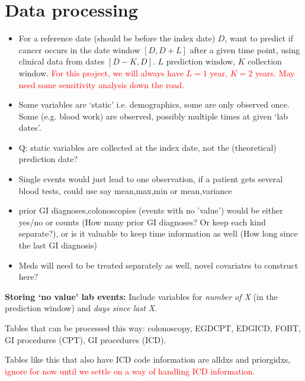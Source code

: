 \documentclass[12pt]{article}
\newcommand{\note}[1]{\textcolor{red}{#1}}
\begin{document}
%

\section*{Data processing}

\begin{itemize}
  \item For a reference date (should be before the index date) $D$, want to predict if cancer occurs in the date window $[D,D+L]$ after a given time point, using clinical data from dates $[D-K,D]$. $L$ prediction window, $K$ collection window. \note{For this project, we will always have $L=1$ year, $K=2$ years. May need some sensitivity analysis down the road.}
  \item Some variables are `static' i.e. demographics, some are only observed once. Some (e.g. blood work) are observed, possibly multiple times at given `lab dates'.
  \item Q: static variables are collected at the index date, not the (theoretical) prediction date?
  \item Single events would just lead to one observation, if a patient gets several blood tests, could use say mean,max,min or mean,variance
  \item prior GI diagnoses,colonoscopies (events with no 'value') would be either yes/no or counts (How many prior GI diagnoses? Or keep each kind separate?), or is it valuable to keep time information as well (How long since the last GI diagnosis)
  \item Meds will need to be treated separately as well, novel covariates to construct here?
\end{itemize}

{\bf Storing `no value' lab events:} Include variables for {\em number of X} (in the prediction window) and {\em days since last X}.

Tables that can be processed this way: colonoscopy, EGDCPT, EDGICD, FOBT, GI procedures (CPT), GI procedures (ICD).

Tables like this that also have ICD code information are alldxs and priorgidxs, \note{ignore for now until we settle on a way of handling ICD information.}
\end{document}
